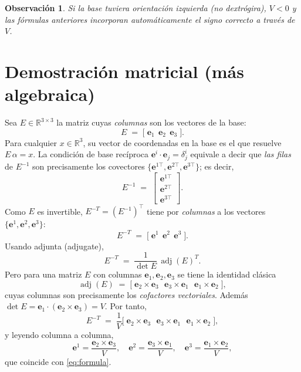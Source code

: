 \documentclass[12pt]{article}
\newtheorem{obs}{Observación}
\begin{document}
\begin{obs}
Si la base tuviera orientación izquierda (no dextrógira), $V<0$ y las fórmulas anteriores incorporan automáticamente el signo correcto a través de $V$.
\end{obs}

\section*{Demostración matricial (más algebraica)}
Sea $E\in\mathbb R^{3\times 3}$ la matriz cuyas \emph{columnas} son los vectores de la base:
\[
E \;=\; \bigl[\;\mathbf e_1\ \ \mathbf e_2\ \ \mathbf e_3\;\bigr].
\]
Para cualquier $x\in\mathbb R^3$, su vector de coordenadas en la base es el que resuelve $E\,\alpha=x$. 
La condición de base recíproca $\mathbf e^i\cdot \mathbf e_j=\delta^i_j$ equivale a decir que 
\emph{las filas} de $E^{-1}$ son precisamente los covectores $\{\mathbf e^{1\top},\mathbf e^{2\top},\mathbf e^{3\top}\}$; es decir,
\[
E^{-1} \;=\; 
\begin{bmatrix}
\mathbf e^{1\top} \\[2pt]
\mathbf e^{2\top} \\[2pt]
\mathbf e^{3\top}
\end{bmatrix}.
\]
Como $E$ es invertible, $E^{-T}=(E^{-1})^\top$ tiene por \emph{columnas} a los vectores $\{\mathbf e^1,\mathbf e^2,\mathbf e^3\}$:
\[
E^{-T} \;=\; \bigl[\;\mathbf e^1\ \ \mathbf e^2\ \ \mathbf e^3\;\bigr].
\]
Usando adjunta (adjugate), 
\[
E^{-T} \;=\; \frac{1}{\det E}\,\operatorname{adj}(E)^{\!T}.
\]
Pero para una matriz $E$ con columnas $\mathbf e_1,\mathbf e_2,\mathbf e_3$ se tiene la identidad clásica
\[
\operatorname{adj}(E) \;=\; 
\bigl[\;\mathbf e_2\times \mathbf e_3\ \ \ \mathbf e_3\times \mathbf e_1\ \ \ \mathbf e_1\times \mathbf e_2\;\bigr],
\]
cuyas columnas son precisamente los \emph{cofactores vectoriales}. Además $\det E=\mathbf e_1\cdot(\mathbf e_2\times \mathbf e_3)=V$. 
Por tanto,
\[
E^{-T} \;=\; \frac{1}{V}
\bigl[\;\mathbf e_2\times \mathbf e_3\ \ \ \mathbf e_3\times \mathbf e_1\ \ \ \mathbf e_1\times \mathbf e_2\;\bigr],
\]
y leyendo columna a columna,
\[
\mathbf e^1=\frac{\mathbf e_2\times \mathbf e_3}{V},\quad
\mathbf e^2=\frac{\mathbf e_3\times \mathbf e_1}{V},\quad
\mathbf e^3=\frac{\mathbf e_1\times \mathbf e_2}{V},
\]
que coincide con \eqref{eq:formula}.
\end{document}
